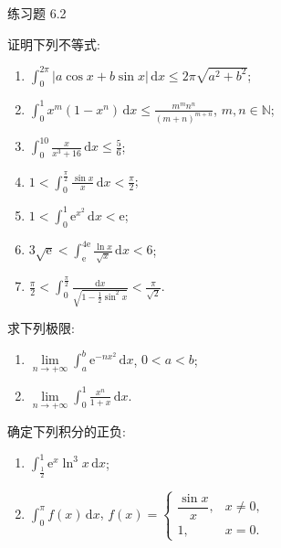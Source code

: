 \begin{exblock}{练习题 6.2}
  \item 证明下列不等式:
  \begin{enumerate}[label=(\arabic*)]
    \item $\int_{0}^{2\pi}|a\cos x+b\sin x|\,\mathrm{d}x\leqslant 2\pi\sqrt{a^{2}+b^{2}}$;
    \item $\int_{0}^{1}x^{m}(1-x^{n})\,\mathrm{d}x\leqslant\frac{m^{m}n^{n}}{(m+n)^{m+n}}$, \quad $m,n\in\mathbb{N}$;
    \item $\int_{0}^{10}\frac{x}{x^{3}+16}\,\mathrm{d}x\leqslant\frac{5}{6}$;
    \item $1<\int_{0}^{\frac{\pi}{2}}\frac{\sin x}{x}\,\mathrm{d}x<\frac{\pi}{2}$;
    \item $1<\int_{0}^{1}\mathrm{e}^{x^{2}}\,\mathrm{d}x<\mathrm{e}$;
    \item $3\sqrt{\mathrm{e}}<\int_{\mathrm{e}}^{4\mathrm{e}}\frac{\ln x}{\sqrt{x}}\,\mathrm{d}x<6$;
    \item $\frac{\pi}{2}<\int_{0}^{\frac{\pi}{2}}\frac{\mathrm{d}x}{\sqrt{1-\frac{1}{2}\sin^{2}x}}<\frac{\pi}{\sqrt{2}}$.
  \end{enumerate}

  \item 求下列极限:
  \begin{enumerate}[label=(\arabic*)]
    \item $\lim\limits_{n\to+\infty}\int_{a}^{b}\mathrm{e}^{-nx^{2}}\,\mathrm{d}x$, \quad $0<a<b$;
    \item $\lim\limits_{n\to+\infty}\int_{0}^{1}\frac{x^{n}}{1+x}\,\mathrm{d}x$.
  \end{enumerate}

  \item 确定下列积分的正负:
  \begin{enumerate}[label=(\arabic*)]
    \item $\int_{\frac{1}{2}}^{1}\mathrm{e}^{x}\ln^{3}x\,\mathrm{d}x$;
    \item $\int_{0}^{\pi}f(x)\,\mathrm{d}x$, \quad $f(x)=\begin{cases}\dfrac{\sin x}{x},&x\neq 0,\\1,&x=0.\end{cases}$
  \end{enumerate}


\end{exblock}
